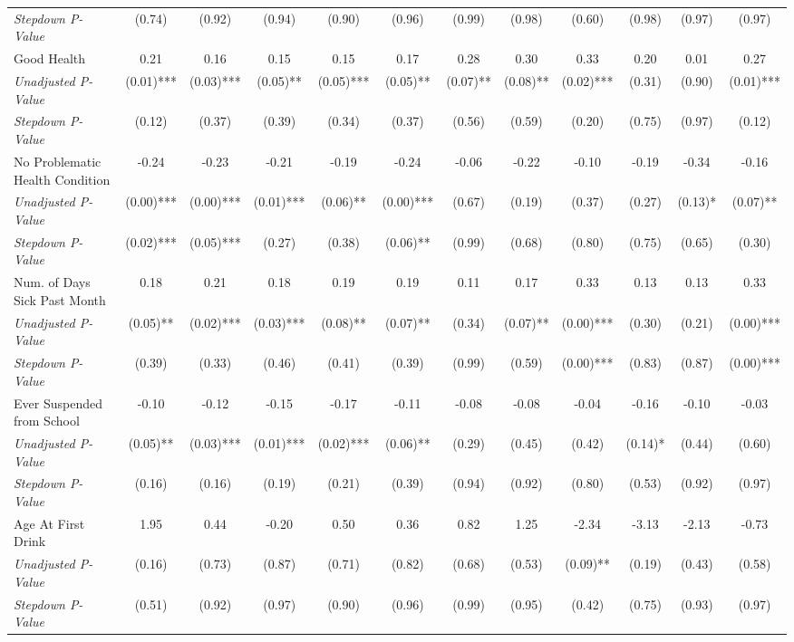 \begin{tabular}{l c c c c c c c c c c c}
\quad \textit{Stepdown P-Value} & (0.74) & (0.92) & (0.94) & (0.90) & (0.96) & (0.99) & (0.98) & (0.60) & (0.98) & (0.97) & (0.97) \\
Good Health & 0.21 & 0.16 & 0.15 & 0.15 & 0.17 & 0.28 & 0.30 & 0.33 & 0.20 & 0.01 & 0.27 \\
\quad \textit{Unadjusted P-Value} & (0.01)*** & (0.03)*** & (0.05)** & (0.05)*** & (0.05)** & (0.07)** & (0.08)** & (0.02)*** & (0.31) & (0.90) & (0.01)*** \\
\quad \textit{Stepdown P-Value} & (0.12) & (0.37) & (0.39) & (0.34) & (0.37) & (0.56) & (0.59) & (0.20) & (0.75) & (0.97) & (0.12) \\
No Problematic Health Condition & -0.24 & -0.23 & -0.21 & -0.19 & -0.24 & -0.06 & -0.22 & -0.10 & -0.19 & -0.34 & -0.16 \\
\quad \textit{Unadjusted P-Value} & (0.00)*** & (0.00)*** & (0.01)*** & (0.06)** & (0.00)*** & (0.67) & (0.19) & (0.37) & (0.27) & (0.13)* & (0.07)** \\
\quad \textit{Stepdown P-Value} & (0.02)*** & (0.05)*** & (0.27) & (0.38) & (0.06)** & (0.99) & (0.68) & (0.80) & (0.75) & (0.65) & (0.30) \\
Num. of Days Sick Past Month & 0.18 & 0.21 & 0.18 & 0.19 & 0.19 & 0.11 & 0.17 & 0.33 & 0.13 & 0.13 & 0.33 \\
\quad \textit{Unadjusted P-Value} & (0.05)** & (0.02)*** & (0.03)*** & (0.08)** & (0.07)** & (0.34) & (0.07)** & (0.00)*** & (0.30) & (0.21) & (0.00)*** \\
\quad \textit{Stepdown P-Value} & (0.39) & (0.33) & (0.46) & (0.41) & (0.39) & (0.99) & (0.59) & (0.00)*** & (0.83) & (0.87) & (0.00)*** \\
Ever Suspended from School & -0.10 & -0.12 & -0.15 & -0.17 & -0.11 & -0.08 & -0.08 & -0.04 & -0.16 & -0.10 & -0.03 \\
\quad \textit{Unadjusted P-Value} & (0.05)** & (0.03)*** & (0.01)*** & (0.02)*** & (0.06)** & (0.29) & (0.45) & (0.42) & (0.14)* & (0.44) & (0.60) \\
\quad \textit{Stepdown P-Value} & (0.16) & (0.16) & (0.19) & (0.21) & (0.39) & (0.94) & (0.92) & (0.80) & (0.53) & (0.92) & (0.97) \\
Age At First Drink & 1.95 & 0.44 & -0.20 & 0.50 & 0.36 & 0.82 & 1.25 & -2.34 & -3.13 & -2.13 & -0.73 \\
\quad \textit{Unadjusted P-Value} & (0.16) & (0.73) & (0.87) & (0.71) & (0.82) & (0.68) & (0.53) & (0.09)** & (0.19) & (0.43) & (0.58) \\
\quad \textit{Stepdown P-Value} & (0.51) & (0.92) & (0.97) & (0.90) & (0.96) & (0.99) & (0.95) & (0.42) & (0.75) & (0.93) & (0.97) \\
\bottomrule
\end{tabular}
